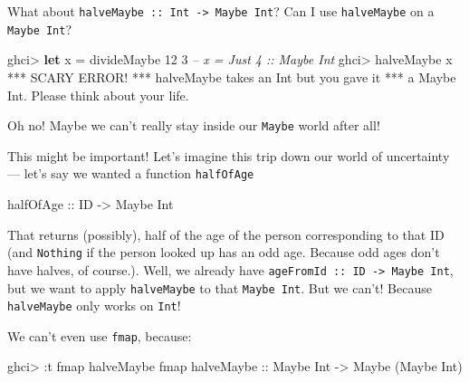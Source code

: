 \documentclass[]{article}
\newenvironment{Shaded}{}{}
\newcommand{\KeywordTok}[1]{\textcolor[rgb]{0.00,0.44,0.13}{\textbf{{#1}}}}
\newcommand{\DataTypeTok}[1]{\textcolor[rgb]{0.56,0.13,0.00}{{#1}}}
\newcommand{\DecValTok}[1]{\textcolor[rgb]{0.25,0.63,0.44}{{#1}}}
\newcommand{\CommentTok}[1]{\textcolor[rgb]{0.38,0.63,0.69}{\textit{{#1}}}}
\newcommand{\OtherTok}[1]{\textcolor[rgb]{0.00,0.44,0.13}{{#1}}}
\newcommand{\FunctionTok}[1]{\textcolor[rgb]{0.02,0.16,0.49}{{#1}}}
\newcommand{\NormalTok}[1]{{#1}}
\begin{document}
What about \texttt{halveMaybe\ ::\ Int\ -\textgreater{}\ Maybe\ Int}?
Can I use \texttt{halveMaybe} on a \texttt{Maybe\ Int}?

\begin{Shaded}
\begin{Highlighting}[]
\NormalTok{ghci}\FunctionTok{>} \KeywordTok{let} \NormalTok{x }\FunctionTok{=} \NormalTok{divideMaybe }\DecValTok{12} \DecValTok{3}     \CommentTok{-- x = Just 4 :: Maybe Int}
\NormalTok{ghci}\FunctionTok{>} \NormalTok{halveMaybe x}
\FunctionTok{***} \DataTypeTok{SCARY} \DataTypeTok{ERROR}\FunctionTok{!}
\FunctionTok{***} \NormalTok{halveMaybe takes an }\DataTypeTok{Int} \NormalTok{but you gave it}
\FunctionTok{***} \NormalTok{a }\DataTypeTok{Maybe} \DataTypeTok{Int}\FunctionTok{.}  \DataTypeTok{Please} \NormalTok{think about your life}\FunctionTok{.}
\end{Highlighting}
\end{Shaded}

Oh no! Maybe we can't really stay inside our \texttt{Maybe} world after
all!

This might be important! Let's imagine this trip down our world of
uncertainty --- let's say we wanted a function \texttt{halfOfAge}

\begin{Shaded}
\begin{Highlighting}[]
\OtherTok{halfOfAge ::} \DataTypeTok{ID} \OtherTok{->} \DataTypeTok{Maybe} \DataTypeTok{Int}
\end{Highlighting}
\end{Shaded}

That returns (possibly), half of the age of the person corresponding to
that ID (and \texttt{Nothing} if the person looked up has an odd age.
Because odd ages don't have halves, of course.). Well, we already have
\texttt{ageFromId\ ::\ ID\ -\textgreater{}\ Maybe\ Int}, but we want to
apply \texttt{halveMaybe} to that \texttt{Maybe\ Int}. But we can't!
Because \texttt{halveMaybe} only works on \texttt{Int}!

We can't even use \texttt{fmap}, because:

\begin{Shaded}
\begin{Highlighting}[]
\NormalTok{ghci}\FunctionTok{>} \FunctionTok{:}\NormalTok{t fmap halveMaybe}
\NormalTok{fmap}\OtherTok{ halveMaybe ::} \DataTypeTok{Maybe} \DataTypeTok{Int} \OtherTok{->} \DataTypeTok{Maybe} \NormalTok{(}\DataTypeTok{Maybe} \DataTypeTok{Int}\NormalTok{)}
\end{Highlighting}
\end{Shaded}
\end{document}
